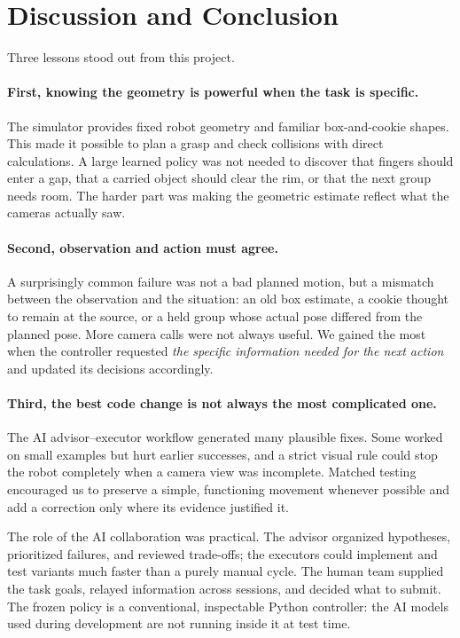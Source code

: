 \section{Discussion and Conclusion}
\label{sec:discussion}
Three lessons stood out from this project.

\paragraph{First, knowing the geometry is powerful when the task is specific.}
The simulator provides fixed robot geometry and familiar box-and-cookie shapes. This made it possible to plan a grasp and check collisions with direct calculations. A large learned policy was not needed to discover that fingers should enter a gap, that a carried object should clear the rim, or that the next group needs room. The harder part was making the geometric estimate reflect what the cameras actually saw.

\paragraph{Second, observation and action must agree.}
A surprisingly common failure was not a bad planned motion, but a mismatch between the observation and the situation: an old box estimate, a cookie thought to remain at the source, or a held group whose actual pose differed from the planned pose. More camera calls were not always useful. We gained the most when the controller requested \emph{the specific information needed for the next action} and updated its decisions accordingly.

\paragraph{Third, the best code change is not always the most complicated one.}
The AI advisor--executor workflow generated many plausible fixes. Some worked on small examples but hurt earlier successes, and a strict visual rule could stop the robot completely when a camera view was incomplete. Matched testing encouraged us to preserve a simple, functioning movement whenever possible and add a correction only where its evidence justified it.

The role of the AI collaboration was practical. The advisor organized hypotheses, prioritized failures, and reviewed trade-offs; the executors could implement and test variants much faster than a purely manual cycle. The human team supplied the task goals, relayed information across sessions, and decided what to submit. The frozen policy is a conventional, inspectable Python controller: the AI models used during development are not running inside it at test time.

